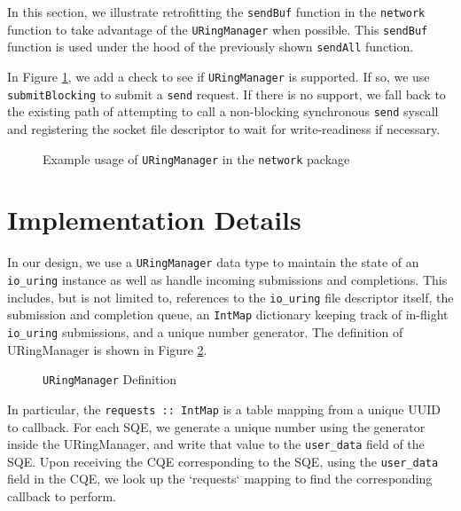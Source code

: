 In this section, we illustrate retrofitting the \texttt{sendBuf}
function in the \texttt{network} function to take advantage of
the \texttt{URingManager} when possible. This \texttt{sendBuf}
function is used under the hood of the previously
shown \texttt{sendAll} function.

In Figure \ref{fig:URingManagerExample.hs}, we add a check
to see if \texttt{URingManager} is supported. If so,
we use \texttt{submitBlocking} to submit a \texttt{send} request.
If there is no support, we fall back to the existing path
of attempting to call a non-blocking synchronous
\texttt{send} syscall and registering the socket file descriptor
to wait for write-readiness if necessary.

\begin{figure}[H]
	\centering
	
	\caption[Example usage of \texttt{URingManager} in the \texttt{network} package]{
		Example usage of \texttt{URingManager} in the \texttt{network} package
	}
	\label{fig:URingManagerExample.hs}
\end{figure}

\section{Implementation Details} 
In our design, we use a \texttt{URingManager} data type to maintain the state of an \texttt{io\_uring} instance as well as handle incoming submissions and completions. This includes, but is not limited to, references to the \texttt{io\_uring} file descriptor itself, the submission and completion queue, an \texttt{IntMap} dictionary keeping track of in-flight \texttt{io\_uring} submissions, and a unique number generator. The definition of URingManager is shown in Figure \ref{fig:URingManager}.

\begin{figure}[ht]
    \centering
	
	\caption[\texttt{URingManager} Definition]{\texttt{URingManager} Definition}
	\label{fig:URingManager}
\end{figure} 



In particular, the \texttt{requests :: IntMap} is a table mapping from a unique UUID to callback. For each SQE, we generate a unique number using the generator inside the URingManager, and write that value to the \texttt{user\_data} field of the SQE. Upon receiving the CQE corresponding to the SQE, using the \texttt{user\_data} field in the CQE, we look up the `requests` mapping to find the corresponding callback to perform.


